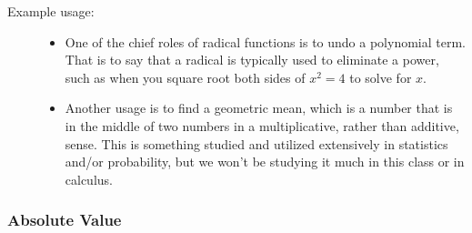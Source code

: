 \documentclass{ximeraXloud}
\begin{document}
\begin{description}
\begin{itemize}
            \end{itemize}
            \item[Example usage:]
            \begin{itemize}
                \item One of the chief roles of radical functions is to undo a polynomial term. That is to say that a radical is typically used to eliminate a power, such as when you square root both sides of $x^2 = 4$ to solve for $x$.
                \item Another usage is to find a geometric mean, which is a number that is in the middle of two numbers in a multiplicative, rather than additive, sense. This is something studied and utilized extensively in statistics and/or probability, but we won't be studying it much in this class or in calculus.
            \end{itemize}
        \end{description}




    \subsubsection*{Absolute Value}
        
\end{document}
